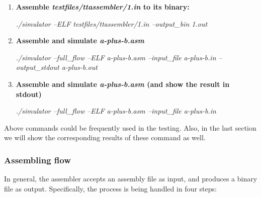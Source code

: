 \documentclass[conference, draftclsnofoot, letterpaper]{IEEETran}
\begin{document}
\begin{enumerate}[label=(\roman*)]\itemsep .5em
	\footnotesize
	\item \textbf{Assemble \emph{testfiles/ttassembler/1.in} to its binary:}
	
	\textit{\color{red}./simulator --ELF testfiles/ttassembler/1.in --output\_bin 1.out}
	
	\item \textbf{Assemble and simulate \emph{a-plus-b.asm}}
	
	\textit{\color{red}./simulator --full\_flow --ELF a-plus-b.asm --input\_file}
	\textit{\color{red}a-plus-b.in --output\_stdout a-plus-b.out}
		\item \textbf{Assemble and simulate \emph{a-plus-b.asm} (and show the result in stdout)}
		
		\textit{\color{red}./simulator --full\_flow --ELF a-plus-b.asm --input\_file a-plus-b.in}
	\end{enumerate}
Above commands could be frequently used in the testing. Also, in the last section we will show the corresponding results of these command as well. 

\subsubsection{Assembling flow}

In general, the assembler accepts an assembly file as input, and produces a binary file as output. Specifically, the process is being handled in four steps:
\end{document}

